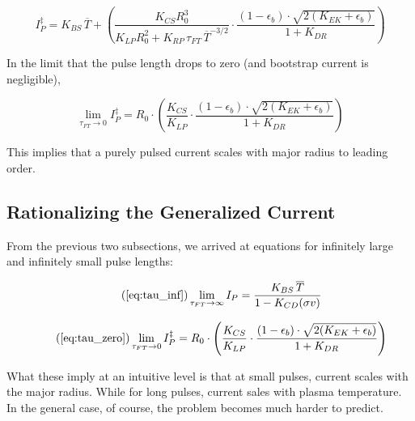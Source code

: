 \begin{equation}
	I_P^\ddagger = K_{BS} \, \overline T + \left( \frac{ K_{CS} R_0^3 }{ K_{LP} R_0^2 + K_{RP} \, \tau_{FT} \, \overline T ^ {-3/2} } \cdot \frac{ ( 1 - \epsilon_b ) \cdot \sqrt{ 2 ( K_{EK} + \epsilon_b ) } }{ 1 + K_{DR} } \right)
\end{equation}

In the limit that the pulse length drops to zero (and bootstrap current is negligible),

\begin{equation}
	\label{eq:tau_zero}
	\lim_{ \tau_{FT} \to 0 } I_P^\ddagger = R_0 \cdot \left( \frac{ K_{CS} }{ K_{LP} } \cdot \frac{ ( 1 - \epsilon_b ) \cdot \sqrt{ 2 ( K_{EK} + \epsilon_b ) } }{ 1 + K_{DR} } \right)
\end{equation}

This implies that a purely pulsed current scales with major radius to leading order.

\subsection{Rationalizing the Generalized Current}

From the previous two subsections, we arrived at equations for infinitely large and infinitely small pulse lengths:

\begin{equation}
	\tag{\ref{eq:tau_inf}}
	\lim_{\tau_{FT} \to \infty} I_P = \frac{ K_{BS} \, \overline T }{ 1 - K_{CD} ( \sigma v ) }
\end{equation}

\begin{equation}
	\tag{\ref{eq:tau_zero}}
	\lim_{ \tau_{FT} \to 0 } I_P^\ddagger = R_0 \cdot \left( \frac{ K_{CS} }{ K_{LP} } \cdot \frac{ ( 1 - \epsilon_b ) \cdot \sqrt{ 2 ( K_{EK} + \epsilon_b ) } }{ 1 + K_{DR} } \right)
\end{equation}

What these imply at an intuitive level is that at small pulses, current scales with the major radius. While for long pulses, current sales with plasma temperature. In the general case, of course, the problem becomes much harder to predict.

%
